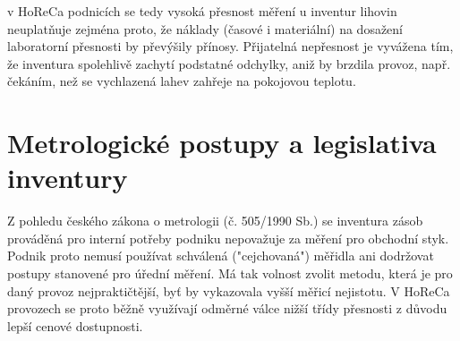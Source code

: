 %
%
%
%	
v HoReCa podnicích se tedy vysoká přesnost měření u inventur lihovin neuplatňuje zejména proto, že náklady (časové i materiální) na dosažení laboratorní přesnosti by převýšily přínosy. Přijatelná nepřesnost je vyvážena tím, že inventura spolehlivě zachytí podstatné odchylky, aniž by brzdila provoz, např. čekáním, než se vychlazená lahev zahřeje na pokojovou teplotu.

%

\section{Metrologické postupy a legislativa inventury}
Z pohledu českého zákona o metrologii (č. 505/1990 Sb.) se inventura zásob prováděná pro interní potřeby podniku nepovažuje za měření pro obchodní styk. Podnik proto nemusí používat schválená ("cejchovaná") měřidla ani dodržovat postupy stanovené pro úřední měření. Má tak volnost zvolit metodu, která je pro daný provoz nejpraktičtější, byť by vykazovala vyšší měřicí nejistotu. V HoReCa provozech se proto běžně využívají odměrné válce nižší třídy přesnosti z důvodu lepší cenové dostupnosti.

